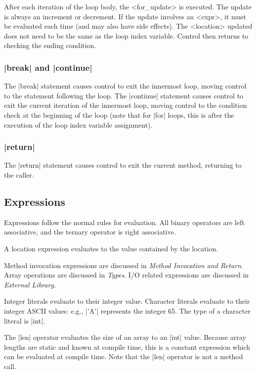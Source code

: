 \documentclass[11pt]{article}
\begin{document}
After each iteration of the loop body, the {\bnf <for_update>} is executed.
The update is always an increment or decrement.
If the update involves an {\bnf <expr>}, it must be evaluated each time (and may also have side effects).
The {\bnf <location>} updated does not need to be the same as the loop index variable.
Control then returns to checking the ending condition.

\subsubsection{\decaf|break| and \decaf|continue|}
The \decaf|break| statement causes control to exit the innermost loop, moving control to the statement following the loop.
The \decaf|continue| statement causes control to exit the current iteration of the innermost loop, moving control to the condition check at the beginning of the loop (note that for \decaf|for| loops, this is after the execution of the loop index variable assignment).

\subsubsection{\decaf|return|}
The \decaf|return| statement causes control to exit the current method, returning to the caller.

\subsection{Expressions}

Expressions follow the normal rules for evaluation.
All binary operators are left associative, and the ternary operator is right associative.

A location expression evaluates to the value contained by the location.

Method invocation expressions are discussed in {\em Method Invocation and Return}.
Array operations are discussed in {\em Types}.
I/O related expressions are discussed in {\em External Library}.

Integer literals evaluate to their integer value.
Character literals evaluate to their integer ASCII values: e.g., \decaf|'A'| represents the integer 65.
The type of a character literal is \decaf|int|.

The \decaf|len| operator evaluates the size of an array to an \decaf|int| value.
Because array lengths are static and known at compile time, this is a constant expression which can be evaluated at compile time.
Note that the \decaf|len| operator is not a method call.
\end{document}
